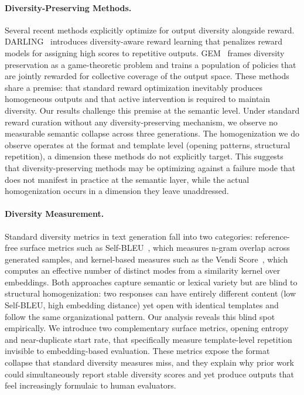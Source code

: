 \paragraph{Diversity-Preserving Methods.}
Several recent methods explicitly optimize for output diversity alongside reward.
DARLING~\cite{placeholder_darling} introduces diversity-aware reward learning that penalizes reward models for assigning high scores to repetitive outputs.
GEM~\cite{placeholder_gem} frames diversity preservation as a game-theoretic problem and trains a population of policies that are jointly rewarded for collective coverage of the output space.
These methods share a premise: that standard reward optimization inevitably produces homogeneous outputs and that active intervention is required to maintain diversity.
Our results challenge this premise at the semantic level.
Under standard reward curation without any diversity-preserving mechanism, we observe no measurable semantic collapse across three generations.
The homogenization we do observe operates at the format and template level (opening patterns, structural repetition), a dimension these methods do not explicitly target.
This suggests that diversity-preserving methods may be optimizing against a failure mode that does not manifest in practice at the semantic layer, while the actual homogenization occurs in a dimension they leave unaddressed.

\paragraph{Diversity Measurement.}
Standard diversity metrics in text generation fall into two categories: reference-free surface metrics such as Self-BLEU~\cite{placeholder_selfbleu}, which measures n-gram overlap across generated samples, and kernel-based measures such as the Vendi Score~\cite{placeholder_vendi}, which computes an effective number of distinct modes from a similarity kernel over embeddings.
Both approaches capture semantic or lexical variety but are blind to structural homogenization: two responses can have entirely different content (low Self-BLEU, high embedding distance) yet open with identical templates and follow the same organizational pattern.
Our analysis reveals this blind spot empirically.
We introduce two complementary surface metrics, opening entropy and near-duplicate start rate, that specifically measure template-level repetition invisible to embedding-based evaluation.
These metrics expose the format collapse that standard diversity measures miss, and they explain why prior work could simultaneously report stable diversity scores and yet produce outputs that feel increasingly formulaic to human evaluators.